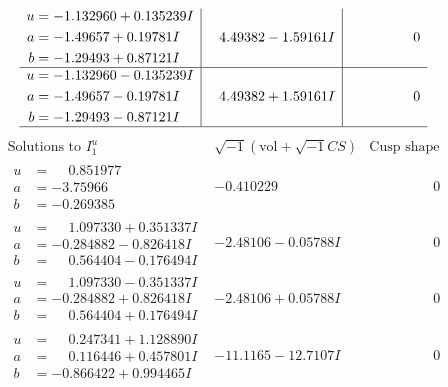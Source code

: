 \documentclass[1p]{elsarticle_modified}
\theoremstyle{definition}
\newcommand{\I}{\sqrt{-1}}
\begin{document}
$$\begin{array}{c|c|c}
\begin{aligned}
u &= -1.132960 + 0.135239 I \\
a &= -1.49657 + 0.19781 I \\
b &= -1.29493 + 0.87121 I\end{aligned}
 & \phantom{-}4.49382 - 1.59161 I & \phantom{-0.000000 } 0 \\ \hline\begin{aligned}
u &= -1.132960 - 0.135239 I \\
a &= -1.49657 - 0.19781 I \\
b &= -1.29493 - 0.87121 I\end{aligned}
 & \phantom{-}4.49382 + 1.59161 I & \phantom{-0.000000 } 0\\
 \hline 
 \end{array}$$\newpage$$\begin{array}{c|c|c}  
\text{Solutions to }I^u_{1}& \I (\text{vol} + \sqrt{-1}CS) & \text{Cusp shape}\\
 \hline 
\begin{aligned}
u &= \phantom{-}0.851977\phantom{ +0.000000I} \\
a &= -3.75966\phantom{ +0.000000I} \\
b &= -0.269385\phantom{ +0.000000I}\end{aligned}
 & -0.410229\phantom{ +0.000000I} & \phantom{-0.000000 } 0 \\ \hline\begin{aligned}
u &= \phantom{-}1.097330 + 0.351337 I \\
a &= -0.284882 - 0.826418 I \\
b &= \phantom{-}0.564404 - 0.176494 I\end{aligned}
 & -2.48106 - 0.05788 I & \phantom{-0.000000 } 0 \\ \hline\begin{aligned}
u &= \phantom{-}1.097330 - 0.351337 I \\
a &= -0.284882 + 0.826418 I \\
b &= \phantom{-}0.564404 + 0.176494 I\end{aligned}
 & -2.48106 + 0.05788 I & \phantom{-0.000000 } 0 \\ \hline\begin{aligned}
u &= \phantom{-}0.247341 + 1.128890 I \\
a &= \phantom{-}0.116446 + 0.457801 I \\
b &= -0.866422 + 0.994465 I\end{aligned}
 & -11.1165 - 12.7107 I & \phantom{-0.000000 } 0 \\ \hline\begin{aligned}

\end{aligned}
\end{array}$$
\end{document}

